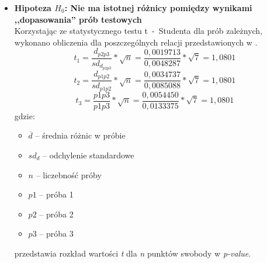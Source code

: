 \begin{itemize}
    \item \textbf{Hipoteza $H_0$: Nie ma istotnej różnicy pomiędzy wynikami ,,dopasowania'' prób testowych} \\
    Korzystając ze statystycznego testu t~-~Studenta dla prób zależnych, wykonano obliczenia dla poszczególnych relacji przedstawionych w .
    \begin{equation}
        \label{eq:t-p1}
        t_1 = \frac{d_{p2p3}}{sd_{d_{p2p3}}} * \sqrt{n} = \frac{0,0019713}{0,0048287} * \sqrt{7} = 1,0801
    \end{equation}
    \begin{equation}
        \label{eq:t-p2}
        t_2 = \frac{d_{p1p2}}{sd_{p1p2}} * \sqrt{n} = \frac{0,0034737}{0,0085088} * \sqrt{7} = 1,0801
    \end{equation}
    \begin{equation}
        \label{eq:t-p3}
        t_3 = \frac{p1p3}{p1p3} * \sqrt{n} = \frac{0,0054450}{0,0133375} * \sqrt{7} = 1,0801
    \end{equation}
    gdzie:
    \begin{itemize}
        \item $\overline{d}$ -- średnia różnic w próbie
        \item $sd_d$ -- odchylenie standardowe
        \item $n$ -- liczebność próby
        \item $p1$ -- próba 1
        \item $p2$ -- próba 2
        \item $p3$ -- próba 3
    \end{itemize}
     przedstawia rozkład wartości \textit{t} dla \textit{n} punktów swobody w \textit{p-value}.
    \begin{table}[H]
        \centering
\end{table}
\end{itemize}
